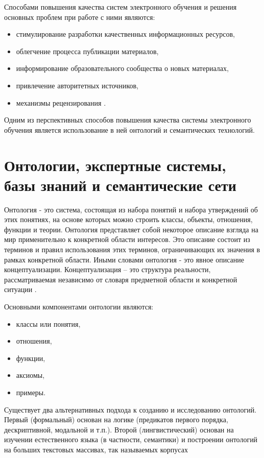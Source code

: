 Способами повышения качества систем электронного обучения и решения основных проблем при работе с ними являются: 

\begin{itemize}
\item стимулирование разработки качественных информационных ресурсов,
\item облегчение процесса публикации материалов, 
\item информирование образовательного сообщества о новых материалах,
\item привлечение авторитетных источников, 
\item механизмы рецензирования \cite{ivannicov2003common}.
\end{itemize}

Одним из перспективных способов повышения качества системы электронного обучения является использование в ней онтологий и семантических технологий.




\section{Онтологии, экспертные системы, базы знаний и семантические сети} \label{sect1_3}

Онтология - это система, состоящая из набора понятий и набора утверждений об этих понятиях, на основе которых можно строить классы, объекты, отношения, функции и теории. Онтология представляет собой некоторое описание взгляда на мир применительно к конкретной области интересов. Это описание состоит из терминов и правил использования этих терминов, ограничивающих их значения в рамках конкретной области. Иными словами онтология - это явное описание концептуализации. Концептуализация – это структура реальности, рассматриваемая
независимо от словаря предметной области и конкретной ситуации \cite{solov2006ontology}. 

Основными компонентами онтологии являются:

\begin{itemize}
\item классы или понятия,
\item отношения,
\item функции,
\item аксиомы,
\item примеры.
\end{itemize}

Существует два альтернативных подхода к созданию и исследованию онтологий. Первый (формальный) основан на логике (предикатов первого порядка, дескриптивной, модальной и т.п.). Второй (лингвистический) основан на изучении естественного языка (в частности,
семантики) и построении онтологий на больших текстовых массивах, так называемых корпусах

